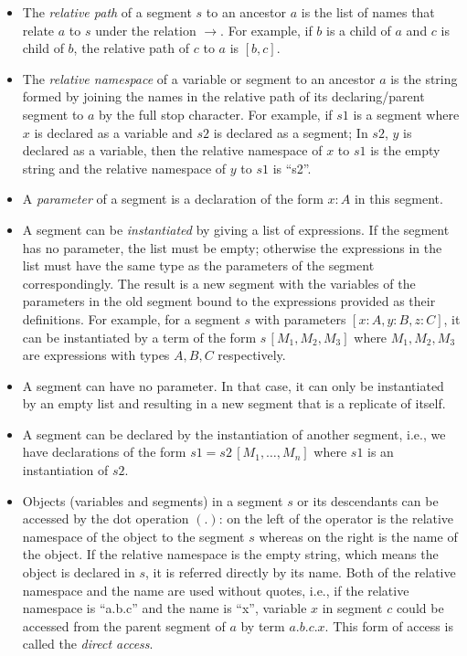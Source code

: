 \begin{definition}[Segment]
\begin{itemize}
  \item The \emph{relative path} of a segment $s$ to an ancestor $a$ is the list of names that relate $a$ to $s$ under the relation $\to$. For example, if $b$ is a child of $a$ and $c$ is child of $b$, the relative path of $c$ to $a$ is $[b,c]$.  
  \item The \emph{relative namespace} of a variable or segment to an ancestor $a$ is the string formed by joining the names in the relative path of its declaring/parent segment to $a$ by the full stop character. For example, if $s1$ is a segment where $x$ is declared as a variable and $s2$ is declared as a segment; In $s2$, $y$ is declared as a variable, then the relative namespace of $x$ to $s1$ is the empty string and the relative namespace of $y$ to $s1$ is ``s2''.
  \item A \emph{parameter} of a segment is a declaration of the form $x:A$ in this segment.
  \item A segment can be \emph{instantiated} by giving a list of expressions. If the segment has no parameter, the list must be empty; otherwise the expressions in the list must have the same type as the parameters of the segment correspondingly. The result is a new segment with the variables of the parameters in the old segment bound to the expressions provided as their definitions. For example, for a segment $s$ with parameters $[x : A, y : B, z : C]$, it can be instantiated by a term of the form $s\,[M_1, M_2, M_3]$ where $M_1, M_2, M_3$ are expressions with types $A, B, C$ respectively.
  \item A segment can have no parameter. In that case, it can only be instantiated by an empty list and resulting in a new segment that is a replicate of itself.
  \item A segment can be declared by the instantiation of another segment, i.e., we have declarations of the form $s1 = s2\,[M_1,\dots,M_n]$ where $s1$ is an instantiation of $s2$.
  \item Objects (variables and segments) in a segment $s$ or its descendants can be accessed by the dot operation $(.)$: on the left of the operator is the relative namespace of the object to the segment $s$ whereas on the right is the name of the object. If the relative namespace is the empty string, which means the object is declared in $s$, it is referred directly by its name. Both of the relative namespace and the name are used without quotes, i.e., if the relative namespace is ``a.b.c'' and the name is ``x'', variable $x$ in segment $c$ could be accessed from the parent segment of $a$ by term $a.b.c.x$. This form of access is called the \emph{direct access}. 

\end{itemize}
\end{definition}
